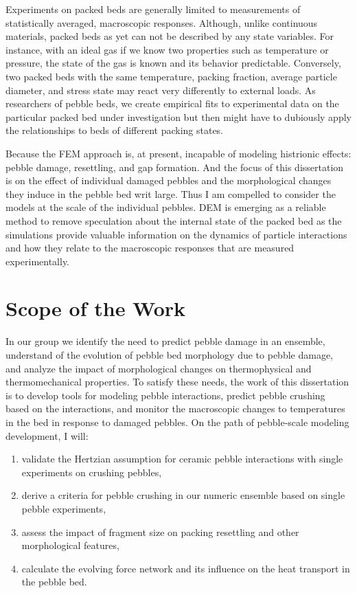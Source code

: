 Experiments on packed beds are generally limited to measurements of statistically averaged, macroscopic responses. Although, unlike continuous materials, packed beds as yet can not be described by any state variables. For instance, with an ideal gas if we know two properties such as temperature or pressure, the state of the gas is known and its behavior predictable. Conversely, two packed beds with the same temperature, packing fraction, average particle diameter, and stress state may react very differently to external loads. As researchers of pebble beds, we create empirical fits to experimental data on the particular packed bed under investigation but then might have to dubiously apply the relationships to beds of different packing states. 

Because the FEM approach is, at present, incapable of modeling histrionic effects: pebble damage, resettling, and gap formation. And the focus of this dissertation is on the effect of individual damaged pebbles and the morphological changes they induce in the pebble bed writ large. Thus I am compelled to consider the models at the scale of the individual pebbles. DEM is emerging as a reliable method to remove speculation about the internal state of the packed bed as the simulations provide valuable information on the dynamics of particle interactions and how they relate to the macroscopic responses that are measured experimentally.

\section{Scope of the Work}\label{sec:intro-scope-of-work}

In our group we identify the need to predict pebble damage in an ensemble, understand of the evolution of pebble bed morphology due to pebble damage, and analyze the impact of morphological changes on thermophysical and thermomechanical properties. To satisfy these needs, the work of this dissertation is to develop tools for modeling pebble interactions, predict pebble crushing based on the interactions, and monitor the macroscopic changes to temperatures in the bed in response to damaged pebbles. On the path of pebble-scale modeling development, I will:
\begin{enumerate}
	\item validate the Hertzian assumption for ceramic pebble interactions with single experiments on crushing pebbles,
	\item derive a criteria for pebble crushing in our numeric ensemble based on single pebble experiments,
	\item assess the impact of fragment size on packing resettling and other morphological features,
	\item calculate the evolving force network and its influence on the heat transport in the pebble bed.
\end{enumerate}

